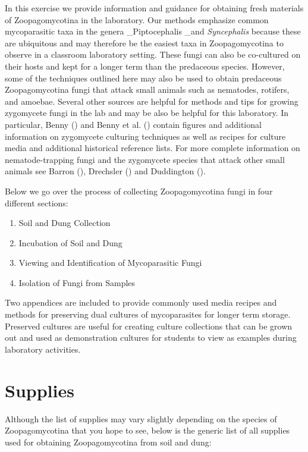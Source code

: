 \documentclass[]{book}
\providecommand{\tightlist}{%
  \setlength{\itemsep}{0pt}\setlength{\parskip}{0pt}}
\begin{document}
In this exercise we provide information and guidance for obtaining fresh
materials of Zoopagomycotina in the laboratory. Our methods emphasize
common mycoparasitic taxa in the genera \_Piptocephalis \_and
\emph{Syncephalis} because these are ubiquitous and may therefore be the
easiest taxa in Zoopagomycotina to observe in a classroom laboratory
setting. These fungi can also be co-cultured on their hosts and kept for
a longer term than the predaceous species. However, some of the
techniques outlined here may also be used to obtain predaceous
Zoopagomycotina fungi that attack small animals such as nematodes,
rotifers, and amoebae. Several other sources are helpful for methods and
tips for growing zygomycete fungi in the lab and may be also be helpful
for this laboratory. In particular, Benny (\citet{Benny_2008}) and Benny
et al. (\citet{Benny_2016}) contain figures and additional information
on zygomycete culturing techniques as well as recipes for culture media
and additional historical reference lists. For more complete information
on nematode-trapping fungi and the zygomycete species that attack other
small animals see Barron (\citet{Barron_2004}), Drechsler
(\citet{Drechsler_1935}) and Duddington (\citet{Duddington_1955}).

Below we go over the process of collecting Zoopagomycotina fungi in four
different sections:

\begin{enumerate}
\def\labelenumi{\arabic{enumi}.}
\tightlist
\item
  Soil and Dung Collection
\item
  Incubation of Soil and Dung
\item
  Viewing and Identification of Mycoparasitic Fungi
\item
  Isolation of Fungi from Samples
\end{enumerate}

Two appendices are included to provide commonly used media recipes and
methods for preserving dual cultures of mycoparasites for longer term
storage. Preserved cultures are useful for creating culture collections
that can be grown out and used as demonstration cultures for students to
view as examples during laboratory activities.

\section{Supplies}\label{supplies}

Although the list of supplies may vary slightly depending on the species
of Zoopagomycotina that you hope to see, below is the generic list of
all supplies used for obtaining Zoopagomycotina from soil and dung:
\end{document}
